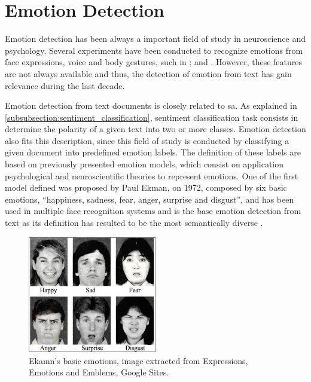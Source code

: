 
\section{Emotion Detection}
\label{sec:emotion_detection}

Emotion detection has been always a important field of study in neuroscience and psychology. Several experiments have been conducted to recognize emotions from face expressions, voice and body gestures, such in \cite{bassili1979emotion}; \cite{banziger2009emotion} and \cite{gunes2007bi}. However, these features are not always available and thus, the detection of emotion from text has gain relevance during the last decade.

Emotion detection from text documents is closely related to \acrshort{sa}. As explained in \ref{subsubsection:sentiment_classification}, sentiment classification task consists in determine the polarity of a given text into two or more classes. Emotion detection also fits this description, since this field of study is conducted by classifying a given document into predefined emotion labels. The definition of these labels are based on previously presented emotion models, which consist on application psychological and neuroscientific theories to represent emotions. One of the first model defined was proposed by Paul Ekman, on 1972, composed by six basic emotions, ``happiness, sadness, fear, anger, surprise and disgust'', and has been used in multiple face recognition systems and is the base emotion detection from text \cite{StevenEmotion2011Classification} as its definition has resulted to be the most semantically diverse \cite{bann2013conceptualisation}.

\begin{figure}[!htp]
  \center
  \includegraphics[width=0.5\textwidth]{figures/emotions_ekman}
  \caption{Ekamn's basic emotions, image extracted from Expressions, Emotions and Emblems, Google Sites.}
  \label{fig:ekman_basic_emotions}
\end{figure}

